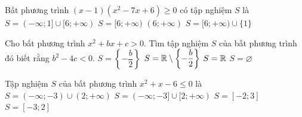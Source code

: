 \begin{ex}%
	Bất phương trình $(x-1)\left(x^2-7x+6\right) \geq 0$ có tập  nghiệm $S$ là
	\choice 
		{$S=(-\infty;  1] \cup[6;+\infty)$}
		 {$S=[6;+\infty)$}
		 {$(6;+\infty)$}
		{\True $S=[6;+\infty)  \cup\{1\}$}
\end{ex}

\begin{ex}%
	Cho bất phương trình $x^2+bx+c > 0$. Tìm tập nghiệm  $S$ của bất phương trình đó biết rằng $b^2-4c < 0$.
	 \choice
		{$S=\left\{-\dfrac{b}{2}  \right\}$}
		{$S={\bf \mathbb{R}}\setminus \left\{-\dfrac{b}{2} \right\}$} 
		{\True  $S={\bf \mathbb{R}}$}
		{$S=\varnothing$} 
\end{ex}

\begin{ex}%
	Tập nghiệm $S$ của bất phương trình $x^{2}+x-6\leq  0$ là
	 \choice
		{$S=(-\infty;-3)\cup(2;+\infty)$} 
		{$S=(-\infty;-3]\cup[2;+\infty)$} 
		{$S=[-2;3]$} 
		 {\True $S=[-3;2]$}
\end{ex}

